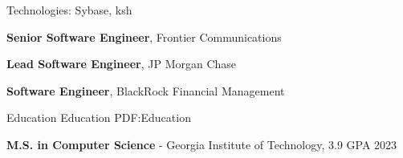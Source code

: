 \documentclass[letterpaper,MMMMyyyy,nonstopmode]{simpleresumecv}
\newif\ifNOTSELECTED
\begin{document}
\begin{Body}
\begin{Detail}
\Gap
Technologies: Sybase, ksh
\end{Detail}
\fi

\else

\iffalse %
\BigGap
\Entry
\href{http://www.paychex.com/}
{\textbf{Paychex}}

\begin{Detail}
	Led team of 5 to create three public-facing fullstack Java/JavaScript applications.

	Created CI/CD deployment pipelines with Hudson.
\end{Detail}
\fi %

\Entry
\textbf{Senior Software Engineer}, Frontier Communications

\ifNOTSELECTED
\begin{Detail}
Created applications to build DSL circuits and track sales commissions in Java and SQL.
\end{Detail}
\fi %

\ifNOTSELECTED
\Gap
\Entry
\textbf{Senior Software Engineer}, Global Crossing/Level3

\begin{Detail}
Led multi-site teams to create telecom applications in Java and SQL.
\end{Detail}
\fi %

\Entry
\textbf{Lead Software Engineer}, JP Morgan Chase
\ifNOTSELECTED
\begin{Detail}
Created trading systems for equity derivatives and HFT trading desks in C, C++, and Excel.
\end{Detail}
\fi %

\Entry
\textbf{Software Engineer}, BlackRock Financial Management
\ifNOTSELECTED
\begin{Detail}
Developed systems for MBS mortgage, Treasury, and Repo trading desks in C and C++.
\end{Detail}
\fi %
\fi %
%

\Section
{Education}
{Education}
{PDF:Education}

\Entry
\textbf{M.S. in Computer Science} -
Georgia Institute of Technology, 3.9 GPA
\hfill 
2023


\end{Body}
\end{document}
